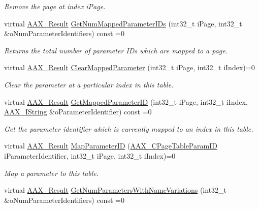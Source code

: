 \begin{DoxyCompactItemize}
\begin{DoxyCompactList}\small\item\em Remove the page at index {\ttfamily i\+Page}. \end{DoxyCompactList}\item 
virtual \hyperlink{a00149_a4d8f69a697df7f70c3a8e9b8ee130d2f}{A\+A\+X\+\_\+\+Result} \hyperlink{a00107_a010687dbfe12a232c393e3af03ea1ef0}{Get\+Num\+Mapped\+Parameter\+I\+Ds} (int32\+\_\+t i\+Page, int32\+\_\+t \&o\+Num\+Parameter\+Identifiers) const =0
\begin{DoxyCompactList}\small\item\em Returns the total number of parameter I\+Ds which are mapped to a page. \end{DoxyCompactList}\item 
virtual \hyperlink{a00149_a4d8f69a697df7f70c3a8e9b8ee130d2f}{A\+A\+X\+\_\+\+Result} \hyperlink{a00107_a9ed083c1f88d39608528cd09e294585c}{Clear\+Mapped\+Parameter} (int32\+\_\+t i\+Page, int32\+\_\+t i\+Index)=0
\begin{DoxyCompactList}\small\item\em Clear the parameter at a particular index in this table. \end{DoxyCompactList}\item 
virtual \hyperlink{a00149_a4d8f69a697df7f70c3a8e9b8ee130d2f}{A\+A\+X\+\_\+\+Result} \hyperlink{a00107_a04689a277ec015d01f2bb7a5530b86bd}{Get\+Mapped\+Parameter\+I\+D} (int32\+\_\+t i\+Page, int32\+\_\+t i\+Index, \hyperlink{a00113}{A\+A\+X\+\_\+\+I\+String} \&o\+Parameter\+Identifier) const =0
\begin{DoxyCompactList}\small\item\em Get the parameter identifier which is currently mapped to an index in this table. \end{DoxyCompactList}\item 
virtual \hyperlink{a00149_a4d8f69a697df7f70c3a8e9b8ee130d2f}{A\+A\+X\+\_\+\+Result} \hyperlink{a00107_a5b089c92962c045e8df1e0f277d23786}{Map\+Parameter\+I\+D} (\hyperlink{a00149_ab4e01b971dac1b25632fd9f710dd8f77}{A\+A\+X\+\_\+\+C\+Page\+Table\+Param\+I\+D} i\+Parameter\+Identifier, int32\+\_\+t i\+Page, int32\+\_\+t i\+Index)=0
\begin{DoxyCompactList}\small\item\em Map a parameter to this table. \end{DoxyCompactList}\item 
virtual \hyperlink{a00149_a4d8f69a697df7f70c3a8e9b8ee130d2f}{A\+A\+X\+\_\+\+Result} \hyperlink{a00107_ad186d2870ad5c188a7375080e8a7907b}{Get\+Num\+Parameters\+With\+Name\+Variations} (int32\+\_\+t \&o\+Num\+Parameter\+Identifiers) const =0

\end{DoxyCompactItemize}
